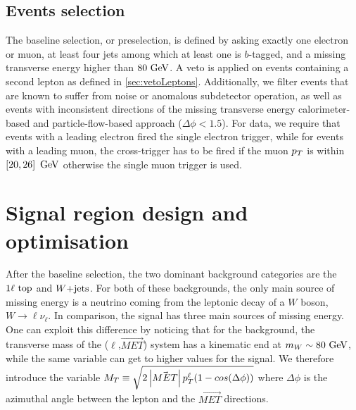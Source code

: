         \subsection{Events selection}

        The baseline selection, or preselection, is defined by asking exactly one electron or muon, at least 
        four jets among which at least one is $b$-tagged, and a missing transverse energy higher than $80 ~\text{GeV}$.
        A veto is applied on events containing a second lepton as defined in \ref{sec:vetoLeptons}. Additionally,
        we filter events that are known to suffer from noise or anomalous subdetector operation, as well as events
        with inconsistent directions of the missing transverse energy calorimeter-based and particle-flow-based
        approach ($\Delta \phi < 1.5$). For data, we require that events with a leading electron fired the single
        electron trigger, while for events with a leading muon, the cross-trigger has to be fired if the muon $p_T$
        is within $\left[ 20, 26 \right] ~\text{GeV}$ otherwise the single muon trigger is used.


        
        
    \section{Signal region design and optimisation \label{sec:analysis_optimization}}

    After the baseline selection, the two dominant background categories are the $1\ell~\text{top}$
    and $\text{$W$+jets}$. For both of these backgrounds, the only main source of missing energy is a neutrino
    coming from the leptonic decay of a $W$ boson, $W \rightarrow \ell \nu_{\ell}$. In comparison,
    the signal has three main sources of missing energy. One can exploit this difference by noticing
    that for the background, the transverse mass of the ($\ell$,$\vec{MET}$) system has a kinematic
    end at $m_{W} \sim 80 ~\text{GeV}$, while the same variable can get to higher values for the signal.
    We therefore introduce the variable $M_T \equiv \sqrt{2 \left|\vec{MET}\right| p_T^\ell ( 1 - cos( \Delta \phi  ) ) }$
    where $\Delta \phi$ is the azimuthal angle between the lepton and the $\vec{MET}$ directions.

